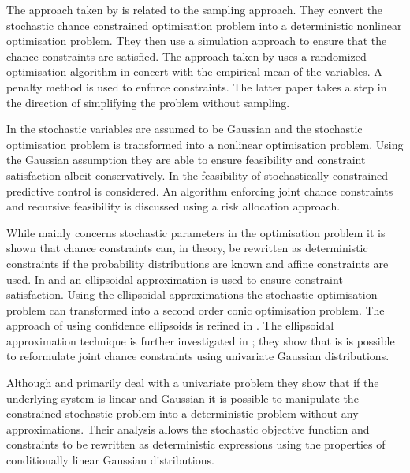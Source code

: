 The approach taken by \cite{li} is related to the sampling approach. They convert the stochastic chance constrained optimisation problem into a deterministic nonlinear optimisation problem. They then use a simulation approach to ensure that the chance constraints are satisfied. The approach taken by \cite{batina} uses a randomized optimisation algorithm in concert with the empirical mean of the variables. A penalty method is used to enforce constraints. The latter paper takes a step in the direction of simplifying the problem without sampling. 

In \cite{li2} the stochastic variables are assumed to be Gaussian and the stochastic optimisation problem is transformed into a nonlinear optimisation problem. Using the Gaussian assumption they are able to ensure feasibility and constraint satisfaction albeit conservatively. In \cite{masahiro} the feasibility of stochastically constrained predictive control is considered. An algorithm enforcing joint chance constraints and recursive feasibility is discussed using a risk allocation approach.

While \cite{schwarm} mainly concerns stochastic parameters in the optimisation problem it is shown that chance constraints can, in theory, be rewritten as deterministic constraints if the probability distributions are known and affine constraints are used. In \cite{vanhessem1} and \cite{vanhessem2} an ellipsoidal approximation is used to ensure constraint satisfaction. Using the ellipsoidal approximations the stochastic optimisation problem can transformed into a second order conic optimisation problem. The approach of using confidence ellipsoids is refined in \cite{cannon}. The ellipsoidal approximation technique is further investigated in \cite{blackmore2}; they show that is is possible to reformulate joint chance constraints using univariate Gaussian distributions.

Although \cite{yan1} and \cite{yan2} primarily deal with a univariate problem they show that if the underlying system is linear and Gaussian it is possible to manipulate the constrained stochastic problem into a deterministic problem without any approximations. Their analysis allows the stochastic objective function and constraints to be rewritten as deterministic expressions using the properties of conditionally linear Gaussian distributions.

